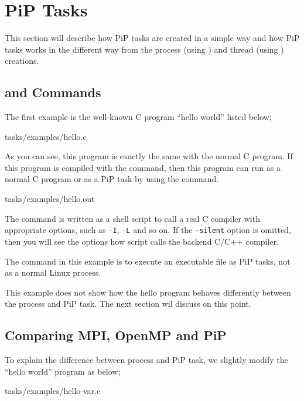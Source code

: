 
\section{PiP Tasks}

This section will describe how PiP tasks are created in a simple way
and how PiP tasks works in the different way from the process (using
) and thread (using ) creations.

\subsection{ and  Commands}
\label{sec:pipcc-exec}

The first example is  the well-known C program ``hello world'' listed
below; 


                {tasks/examples/hello.c}

As you can see, this program is exactly the same with the normal C
program. If this program is compiled with the  command,
then this program can run as a normal C program or as a PiP task by
using the  command.


                {tasks/examples/hello.out}

The  command is written as a shell script to call a real
C compiler with appropriate options, such as {\tt -I}, {\tt -L} and so
on. If the {\tt --silent} option is omitted, then you will see the
options how  script calls the backend C/C++ compiler.

The  command in this example is to execute an
executable file as PiP tasks, not as a normal Linux process.

This example does not show how the hello program behaves differently
between the process and PiP task. The next section wil discuss on this
point.

\subsection{Comparing MPI, OpenMP and PiP}

To explain the difference between process and PiP task, we slightly
modify the ``hello world'' program as below;

 {tasks/examples/hello-var.c}

